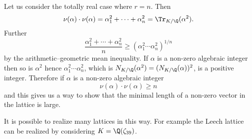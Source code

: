 Let us consider the totally real case where $r=n$.  Then
\[ \nu(\alpha)\cdot\nu(\alpha) = \alpha_1^2 + \dotsb + \alpha_n^2 = \Tr_{K/\Q}(\alpha^2) . \]
Further
\[ \frac{\alpha_1^2+\dotsb+\alpha_n^2}{n} \geq (\alpha_1^2\dotsm\alpha_n^2)^{1/n} \]
by the arithmetic--geometric mean inequality.  If $\alpha$ is a non-zero algebraic integer then so is $\alpha^2$ hence $\alpha_1^2\dotsm\alpha_n^2$, which is $N_{K/\Q}(\alpha^2)=(N_{K/\Q}(\alpha))^2$, is a positive integer.  Therefore if $\alpha$ is a non-zero algebraic integer
\[ \nu(\alpha)\cdot\nu(\alpha) \geq n \]
and this gives us a way to show that the minimal length of a non-zero vector in the lattice is large.

It is possible to realize many lattices in this way.  For example the Leech lattice can be realized by considering $K=\Q(\zeta_{39})$.